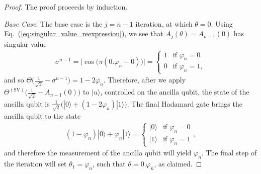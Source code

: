\documentclass[aps,pra,showpacs,notitlepage,twocolumn,superscriptaddress,nofootinbib]{revtex4-1}
\begin{document}
\begin{proof}
The proof proceeds by induction. 

\textit{Base Case}: The base case is the $j=n-1$ iteration, at which $\theta = 0$. Using Eq.~(\ref{eq:singular_value_reexpression}), we see that $A_j(\theta) = A_{n-1}(0)$ has singular value
\begin{equation}
\begin{gathered}
    \sigma^{n-1} = \big|\cos\big(\pi (0.\varphi_{n}-0) \big) \big| =
    \begin{cases}
        1 & \text{if } \varphi_n = 0 \\
        0 & \text{if } \varphi_n = 1,
    \end{cases}
\end{gathered}
\end{equation}
and so $\Theta\Big(\frac{1}{\sqrt{2}}-\sigma^{n-1}\Big) = 1-2\varphi_n$. Therefore, after we apply $\Theta^{(\text{SV})}\Big(\frac{1}{\sqrt{2}}-A_{n-1}(0)\Big)$ to $|u\rangle$, controlled on the ancilla qubit, the state of the ancilla qubit is $\frac{1}{\sqrt{2}}\Big(|0\rangle + (1-2\varphi_n)|1\rangle \Big)$. The final Hadamard gate brings the ancilla qubit to the state
\begin{equation}
\begin{gathered}
    (1-\varphi_n)|0\rangle + \varphi_n |1\rangle = 
    \begin{cases}
        |0\rangle & \text{if } \varphi_n = 0 \\
        |1\rangle & \text{if } \varphi_n = 1
    \end{cases},
\end{gathered}
\end{equation}
and therefore the measurement of the ancilla qubit will yield $\varphi_n$. The final step of the iteration will set $\theta_1 = \varphi_n$, such that $\theta = 0.\varphi_n$, as claimed.


\end{proof}
\end{document}
